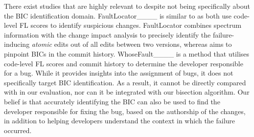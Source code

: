 There exist studies that are highly relevant to \name despite not being specifically about the BIC identification domain. FaultLocator____ is similar to \name as both use
code-level FL scores to identify suspicious changes. FaultLocator combines spectrum information with the change impact
analysis to precisely identify the failure-inducing \emph{atomic} edits out
of all edits between two versions, whereas \name aims to pinpoint BICs in the
commit history. WhoseFault____ is a method that utilises code-level FL scores and commit history to determine the developer responsible for a bug. While it provides insights into the assignment of bugs, it does not specifically target BIC identification. As a result, it cannot be directly compared with \name in our evaluation, nor can it be integrated with our bisection algorithm. Our belief is that accurately identifying the BIC can also be used to find the developer responsible for fixing the bug, based on the authorship of the changes, in addition to helping developers understand the context in which the failure occurred.








